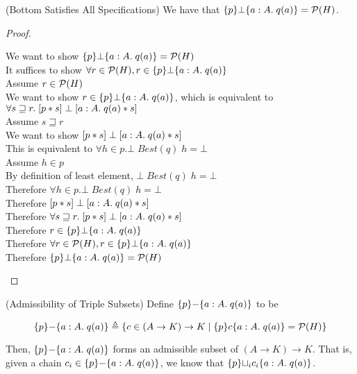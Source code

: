 \begin{lemma}{(Bottom Satisfies All Specifications)}
We have that $\{{p}\}{\bot}\{{a:A}.\;{q(a)}\} = \mathcal{P}(H)$. 
\end{lemma}
\begin{proof}
\begin{tabbedproof}
\oo We want to show $\{{p}\}{\bot}\{{a:A}.\;{q(a)}\} = \mathcal{P}(H)$ \\
\oo It suffices to show $\forall r \in \mathcal{P}(H), r \in \{{p}\}{\bot}\{{a:A}.\;{q(a)}\}$ \\
\oo Assume $r \in \mathcal{P}(H)$ \\
\ooo We want to show $r \in \{{p}\}{\bot}\{{a:A}.\;{q(a)}\}$, which is equivalent to 
     $\forall s \sqsupseteq r.\; [{p*s}]\;{\bot}\;[{a:A}.\;{q(a) * s}]$ \\
\ooo Assume $s \sqsupseteq r$ \\
\oooo We want to show $[{p*s}]\;{\bot}\;[{a:A}.\;{q(a) * s}]$ \\
\oooo This is equivalent to $\forall h \in p. \bot\;Best(q)\;h = \bot$ \\
\oooo Assume $h \in p$ \\
\ooooo  By definition of least element, $\bot\;Best(q)\;h = \bot$ \\
\oooo Therefore $\forall h \in p. \bot\;Best(q)\;h = \bot$ \\
\oooo Therefore $[{p*s}]\;{\bot}\;[{a:A}.\;{q(a) * s}]$ \\
\ooo Therefore $\forall s \sqsupseteq r.\; [{p*s}]\;{\bot}\;[{a:A}.\;{q(a) * s}]$ \\
\ooo Therefore $r \in \{{p}\}{\bot}\{{a:A}.\;{q(a)}\}$ \\
\oo Therefore $\forall r \in \mathcal{P}(H), r \in \{{p}\}{\bot}\{{a:A}.\;{q(a)}\}$ \\
\oo Therefore $\{{p}\}{\bot}\{{a:A}.\;{q(a)}\} = \mathcal{P}(H)$ \\
\end{tabbedproof}
\end{proof}

\begin{lemma}{(Admissibility of Triple Subsets)}
Define $\{{p}\}{-}\{{a:A}.\;{q(a)}\}$ to be 

\begin{displaymath}
\{{p}\}{-}\{{a:A}.\;{q(a)}\} \triangleq
         \{{{c \in (A \to K) \to K}\;|\;{ \{{p}\}{c}\{{a:A}.\;{q(a)}\} = \mathcal{P}(H) }}\}
\end{displaymath}

Then, $\{{p}\}{-}\{{a:A}.\;{q(a)}\}$ forms an admissible subset of $(A \to K) \to K$. 
That is, given a chain $c_i \in \{{p}\}{-}\{{a:A}.\;{q(a)}\}$, we know that 
$\{{p}\}{\sqcup_i c_i}\{{a:A}.\;{q(a)}\}$. 
\end{lemma}

